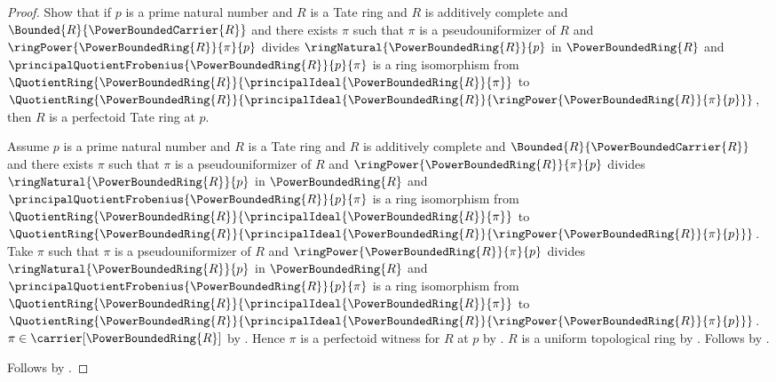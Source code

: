 \begin{proof}
    Show that if $p$ is a prime natural number and
        $R$ is a Tate ring and
        $R$ is additively complete and
        $\Bounded{R}{\PowerBoundedCarrier{R}}$ and
        there exists $\pi$ such that
            $\pi$ is a pseudouniformizer of $R$ and
            $\ringPower{\PowerBoundedRing{R}}{\pi}{p}$ divides
                $\ringNatural{\PowerBoundedRing{R}}{p}$ in
                $\PowerBoundedRing{R}$ and
            $\principalQuotientFrobenius{
                    \PowerBoundedRing{R}}{p}{\pi}$
                is a ring isomorphism from
                $\QuotientRing{\PowerBoundedRing{R}}{
                    \principalIdeal{\PowerBoundedRing{R}}{\pi}}$ to
                $\QuotientRing{\PowerBoundedRing{R}}{
                    \principalIdeal{\PowerBoundedRing{R}}{
                        \ringPower{\PowerBoundedRing{R}}{\pi}{p}}}$,
        then $R$ is a perfectoid Tate ring at $p$.
    \begin{subproof}
        Assume $p$ is a prime natural number and
            $R$ is a Tate ring and
            $R$ is additively complete and
            $\Bounded{R}{\PowerBoundedCarrier{R}}$ and
            there exists $\pi$ such that
                $\pi$ is a pseudouniformizer of $R$ and
                $\ringPower{\PowerBoundedRing{R}}{\pi}{p}$ divides
                    $\ringNatural{\PowerBoundedRing{R}}{p}$ in
                    $\PowerBoundedRing{R}$ and
                $\principalQuotientFrobenius{
                        \PowerBoundedRing{R}}{p}{\pi}$
                    is a ring isomorphism from
                    $\QuotientRing{\PowerBoundedRing{R}}{
                        \principalIdeal{\PowerBoundedRing{R}}{\pi}}$ to
                    $\QuotientRing{\PowerBoundedRing{R}}{
                        \principalIdeal{\PowerBoundedRing{R}}{
                            \ringPower{\PowerBoundedRing{R}}{\pi}{p}}}$.
        Take $\pi$ such that
            $\pi$ is a pseudouniformizer of $R$ and
            $\ringPower{\PowerBoundedRing{R}}{\pi}{p}$ divides
                $\ringNatural{\PowerBoundedRing{R}}{p}$ in
                $\PowerBoundedRing{R}$ and
            $\principalQuotientFrobenius{
                    \PowerBoundedRing{R}}{p}{\pi}$
                is a ring isomorphism from
                $\QuotientRing{\PowerBoundedRing{R}}{
                    \principalIdeal{\PowerBoundedRing{R}}{\pi}}$ to
                $\QuotientRing{\PowerBoundedRing{R}}{
                    \principalIdeal{\PowerBoundedRing{R}}{
                        \ringPower{\PowerBoundedRing{R}}{\pi}{p}}}$.
        $\pi\in\carrier[\PowerBoundedRing{R}]$ by
            .
        Hence $\pi$ is a perfectoid witness for $R$ at $p$ by
            .
        $R$ is a uniform topological ring by
            .
        Follows by .
    \end{subproof}
    Follows by \auto.
\end{proof}
